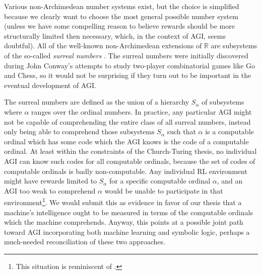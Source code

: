 \documentclass[reqno]{article}
\theoremstyle{definition}
\begin{document}
Various non-Archimedean
number systems exist, but the choice is simplified because we clearly want
to choose the most general possible number system (unless we have
some compelling reason to believe rewards should be more structurally limited
then necessary, which, in the context of AGI, seems doubtful). All of the
well-known non-Archimedean extensions of $\mathbb R$ are subsystems of the
so-called \emph{surreal numbers} \cite{conway} \cite{knuth}. The surreal
numbers were initially discovered during John Conway's attempts to study
two-player combinatorial games like Go and Chess, so it would not be
surprising if they turn out to be important in the eventual development of
AGI.


The surreal numbers are defined as the
union of a hierarchy $S_\alpha$ of subsystems where $\alpha$ ranges over the
ordinal numbers. In practice, any particular AGI might not be capable of comprehending the
entire class of all surreal numbers, instead only being able to comprehend those
subsystems $S_\alpha$ such that $\alpha$ is a computable ordinal which has some
code which the AGI knows is the code of a computable ordinal. At least within the
constraints of the Church-Turing thesis, no individual AGI can know such codes
for all computable ordinals, because the set of codes of computable ordinals is
badly non-computable. Any individual RL environment might have rewards limited
to $S_\alpha$ for a specific computable ordinal $\alpha$, and an AGI too weak to
comprehend $\alpha$ would be unable to participate in that
environment\footnote{This situation is reminiscent of \cite{hibbard2011measuring}.}.
We would submit this as evidence in favor of our thesis \cite{alexander2019measuring}
that a machine's intelligence ought to be measured in terms of the computable ordinals
which the machine comprehends. Anyway, this points at a possible joint path
toward AGI incorporating both machine learning and symbolic logic, perhaps
a much-needed reconciliation of these two approaches.
\end{document}
